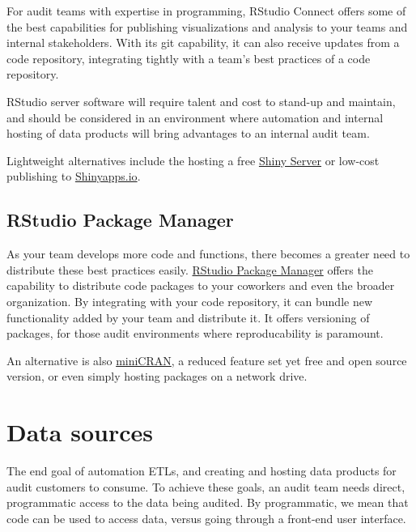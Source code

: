 \documentclass[
]{book}
\begin{document}
For audit teams with expertise in programming, RStudio Connect offers some of the best capabilities for publishing visualizations and analysis to your teams and internal stakeholders. With its git capability, it can also receive updates from a code repository, integrating tightly with a team's best practices of a code repository.

RStudio server software will require talent and cost to stand-up and maintain, and should be considered in an environment where automation and internal hosting of data products will bring advantages to an internal audit team.

Lightweight alternatives include the hosting a free \href{https://rstudio.com/products/shiny/shiny-server/}{Shiny Server} or low-cost publishing to \href{https://www.shinyapps.io}{Shinyapps.io}.

\hypertarget{rstudio-package-manager}{%
\subsection{RStudio Package Manager}\label{rstudio-package-manager}}

As your team develops more code and functions, there becomes a greater need to distribute these best practices easily. \href{https://rstudio.com/products/package-manager/}{RStudio Package Manager} offers the capability to distribute code packages to your coworkers and even the broader organization. By integrating with your code repository, it can bundle new functionality added by your team and distribute it. It offers versioning of packages, for those audit environments where reproducability is paramount.

An alternative is also \href{https://cran.r-project.org/web/packages/miniCRAN/index.html}{miniCRAN}, a reduced feature set yet free and open source version, or even simply hosting packages on a network drive.

\hypertarget{data-sources}{%
\section{Data sources}\label{data-sources}}

The end goal of automation ETLs, and creating and hosting data products for audit customers to consume. To achieve these goals, an audit team needs direct, programmatic access to the data being audited. By programmatic, we mean that code can be used to access data, versus going through a front-end user interface.
\end{document}
